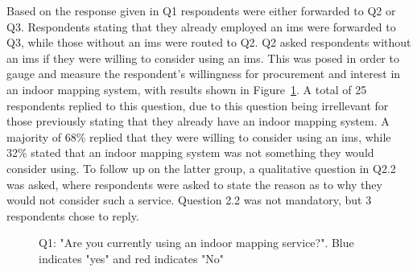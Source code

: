 Based on the response given in Q1 respondents were either forwarded to Q2 or Q3. Respondents stating that they already employed an \gls{ims} were forwarded to Q3, while those without an \gls{ims} were routed to Q2. Q2 asked respondents without an \gls{ims} if they were willing to consider using an \gls{ims}. This was posed in order to gauge and measure the respondent's willingness for procurement and interest in an indoor mapping system, with results shown in Figure~\ref{fig:q2}. A total of 25 respondents replied to this question, due to this question being irrellevant for those previously stating that they already have an indoor mapping system. A majority of 68\% replied that they were willing to consider using an \gls{ims}, while 32\% stated that an indoor mapping system was not something they would consider using. To follow up on the latter group, a qualitative question in Q2.2 was asked, where respondents were asked to state the reason as to why they would not consider such a service. Question 2.2 was not mandatory, but 3 respondents chose to reply.    


\begin{figure}[H]
    \centering
    \caption{Q1: "Are you currently using an indoor mapping service?". Blue indicates "yes" and red indicates "No"}
    \label{fig:q2}
\end{figure}


